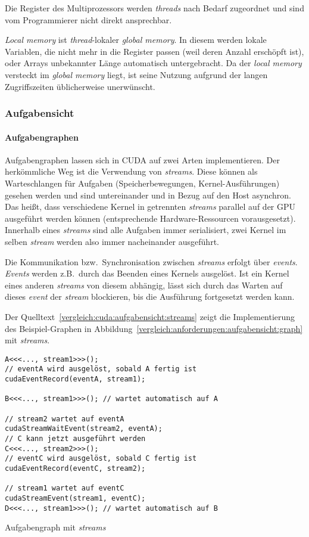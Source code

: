 Die Register des Multiprozessors werden \textit{threads} nach Bedarf zugeordnet
und sind vom Programmierer nicht direkt ansprechbar.

\textit{Local memory} ist \textit{thread}-lokaler \textit{global memory}. In
diesem werden lokale Variablen, die nicht mehr in die Register passen
(weil deren Anzahl erschöpft ist), oder Arrays unbekannter Länge automatisch
untergebracht. Da der \textit{local memory} versteckt im \textit{global memory}
liegt, ist seine Nutzung aufgrund der langen Zugriffszeiten üblicherweise
unerwünscht.

\subsubsection{Aufgabensicht}

\paragraph{Aufgabengraphen}

Aufgabengraphen lassen sich in CUDA auf zwei Arten implementieren. Der
herkömmliche Weg ist die Verwendung von \textit{streams}. Diese können als
Warteschlangen für Aufgaben (Speicherbewegungen, Kernel-Ausführungen) gesehen
werden und sind untereinander und in Bezug auf den Host asynchron. Das heißt,
dass verschiedene Kernel in getrennten \textit{streams} parallel auf der GPU
ausgeführt werden können (entsprechende Hardware-Ressourcen vorausgesetzt).
Innerhalb eines \textit{streams} sind alle Aufgaben immer serialisiert, zwei
Kernel im selben \textit{stream} werden also immer nacheinander ausgeführt.

Die Kommunikation bzw.\ Synchronisation zwischen \textit{streams} erfolgt über
\textit{events}. \textit{Events} werden z.B.\ durch das Beenden eines Kernels
ausgelöst. Ist ein Kernel eines anderen \textit{streams} von diesem abhängig,
lässt sich durch das Warten auf dieses \textit{event} der \textit{stream}
blockieren, bis die Ausführung fortgesetzt werden kann.

Der Quelltext~\ref{vergleich:cuda:aufgabensicht:streams} zeigt die
Implementierung des Beispiel-Graphen
in Abbildung~\ref{vergleich:anforderungen:aufgabensicht:graph} mit
\textit{streams}.

\begin{code}
    \begin{verbatim}
A<<<..., stream1>>>();
// eventA wird ausgelöst, sobald A fertig ist
cudaEventRecord(eventA, stream1);

B<<<..., stream1>>>(); // wartet automatisch auf A

// stream2 wartet auf eventA
cudaStreamWaitEvent(stream2, eventA);
// C kann jetzt ausgeführt werden
C<<<..., stream2>>>();
// eventC wird ausgelöst, sobald C fertig ist
cudaEventRecord(eventC, stream2);

// stream1 wartet auf eventC
cudaStreamEvent(stream1, eventC);
D<<<..., stream1>>>(); // wartet automatisch auf B
    \end{verbatim}
    \caption{Aufgabengraph mit \textit{streams}}
    \label{vergleich:cuda:aufgabensicht:streams}
\end{code}


